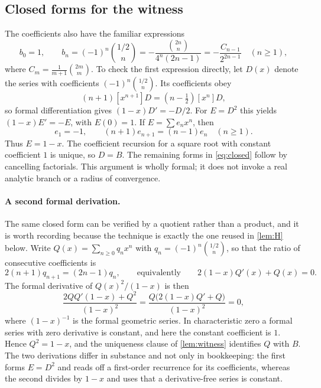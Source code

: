 \documentclass[11pt,letterpaper]{article}
\theoremstyle{definition}
\theoremstyle{remark}
\begin{document}
\subsection{Closed forms for the witness}
The coefficients also have the familiar expressions
\begin{equation}\label{eq:closed}
 b_0=1,\qquad
 b_n=(-1)^n\binom{1/2}{n}
 =-\frac{\binom{2n}{n}}{4^n(2n-1)}
 =-\frac{C_{n-1}}{2^{2n-1}}\quad(n\ge1),
\end{equation}
where $C_m=\frac{1}{m+1}\binom{2m}{m}$. To check the first expression directly,
let $D(x)$ denote the series with coefficients $(-1)^n\binom{1/2}{n}$.
Its coefficients obey
\[
 (n+1)[x^{n+1}]D=(n-\tfrac12)[x^n]D,
\]
so formal differentiation gives $(1-x)D'=-D/2$. For $E=D^2$ this yields
$(1-x)E'=-E$, with $E(0)=1$. If $E=\sum e_nx^n$, then
\[
 e_1=-1,\qquad (n+1)e_{n+1}=(n-1)e_n\quad(n\ge1).
\]
Thus $E=1-x$. The coefficient recursion for a square root with constant
coefficient $1$ is unique, so $D=B$. The remaining forms in \eqref{eq:closed}
follow by cancelling factorials. This argument is wholly formal; it does not
invoke a real analytic branch or a radius of convergence.

\paragraph{A second formal derivation.}
The same closed form can be verified by a quotient rather than a product, and
it is worth recording because the technique is exactly the one reused in
\cref{lem:H} below. Write $Q(x)=\sum_{n\ge0}q_nx^n$ with
$q_n=(-1)^n\binom{1/2}{n}$, so that the ratio of consecutive coefficients is
\[
 2(n+1)q_{n+1}=(2n-1)q_n,
 \qquad\text{equivalently}\qquad
 2(1-x)Q'(x)+Q(x)=0.
\]
The formal derivative of $Q(x)^2/(1-x)$ is then
\[
 \frac{2QQ'(1-x)+Q^2}{(1-x)^2}
 =\frac{Q\bigl(2(1-x)Q'+Q\bigr)}{(1-x)^2}=0,
\]
where $(1-x)^{-1}$ is the formal geometric series. In characteristic zero a
formal series with zero derivative is constant, and here the constant
coefficient is $1$. Hence $Q^2=1-x$, and the uniqueness clause of
\cref{lem:witness} identifies $Q$ with $B$. The two derivations differ in
substance and not only in bookkeeping: the first forms $E=D^2$ and reads off a
first-order recurrence for its coefficients, whereas the second divides by
$1-x$ and uses that a derivative-free series is constant.
\end{document}
